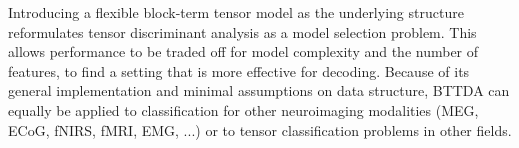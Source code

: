 Introducing a flexible block-term tensor model as the underlying structure
reformulates tensor discriminant analysis as a model selection
problem.
This allows performance to be traded off for model complexity and the number of
features, to find a setting that is more effective for decoding.
Because of its general implementation and minimal assumptions on data structure,
BTTDA can equally be applied to classification for other neuroimaging modalities
(MEG, ECoG, fNIRS, fMRI, EMG, ...) or to tensor classification problems in other
fields.

